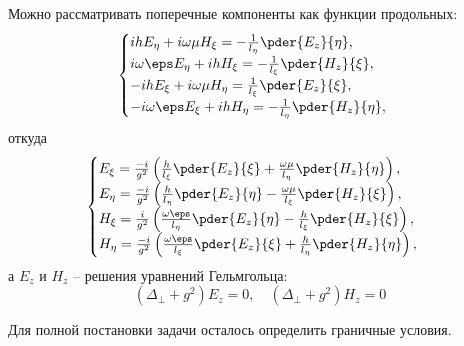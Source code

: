 Можно рассматривать поперечные компоненты как функции продольных:
\[
	\begin{cases}
		ihE_\eta + i\omega\mu H_\xi = -\frac{1}{l_\eta}\pder{E_z}{\eta},\\
		i\omega\eps E_\eta + ihH_\xi = -\frac{1}{l_\xi}\pder{H_z}{\xi},\\
		-ihE_\xi + i\omega\mu H_\eta = \frac{1}{l_\xi}\pder{E_z}{\xi},\\
		- i\omega\eps E_\xi + ihH_\eta = -\frac{1}{l_\eta}\pder{H_z}{\eta},\\
	\end{cases}
\]
откуда
\[
	\begin{cases}
		E_\xi  = \frac{-i}{g^2}\left(\frac{h}{l_\xi}\pder{E_z}{\xi} +\frac{\omega\mu}{l_\eta}\pder{H_z}{\eta}\right),\\
		E_\eta = \frac{-i}{g^2}\left(\frac{h}{l_\eta}\pder{E_z}{\eta} - \frac{\omega\mu}{l_\xi}\pder{H_z}{\xi}\right),\\
		H_\xi  = \frac{i}{g^2}\left(\frac{\omega\eps}{l_\eta}\pder{E_z}{\eta} - \frac{h}{l_\xi}\pder{H_z}{\xi}\right),\\
		H_\eta = \frac{-i}{g^2}\left(\frac{\omega\eps}{l_\xi}\pder{E_z}{\xi} + \frac{h}{l_\eta}\pder{H_z}{\eta}\right),
	\end{cases}
\]
а \( E_z \) и \( H_z \) -- решения уравнений Гельмгольца:
\[
	(\Delta_\perp + g^2) E_z = 0, \quad (\Delta_\perp + g^2) H_z = 0
\]

Для полной постановки задачи осталось определить граничные условия.